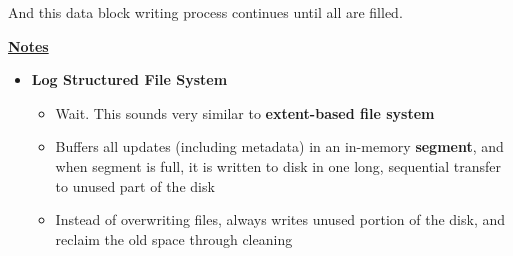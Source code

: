 \documentclass[12pt]{article}
\begin{document}
\begin{enumerate}[1.]
\begin{enumerate}[1)]
        \bigskip

        And this data block writing process continues until all are filled.

        \bigskip

        \underline{\textbf{Notes}}

        \begin{itemize}
            \item \textbf{Log Structured File System}

            \begin{itemize}
                \item Wait. This sounds very similar to \textbf{extent-based file system}
                \item Buffers all updates (including metadata) in an in-memory \textbf{segment},
                and when segment is full, it is written to disk in one long, sequential
                transfer to unused part of the disk
                \item Instead of overwriting files, always writes unused
                portion of the disk, and reclaim the old space through cleaning


\end{itemize}
\end{itemize}
\end{enumerate}
\end{enumerate}
\end{document}
